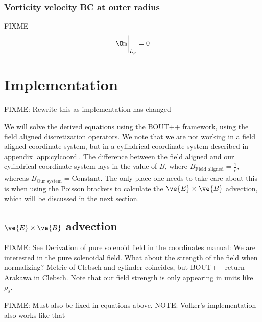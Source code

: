 \subsubsection{Vorticity velocity BC at outer radius}
%
%
FIXME
%
\begin{align*}
    \Om \bigg|_{L_\rho} = 0
\end{align*}


\section{Implementation}
\label{sec:implementation}
FIXME: Rewrite this as implementation has changed

%
We will solve the derived equations using the BOUT++ framework, using the field
aligned discretization operators. We note that we are not working in a field
aligned coordinate system, but in a cylindrical coordinate system described in
appendix \ref{app:cylcoord}. The difference between the field aligned and our
cylindrical coordinate system lays in the value of $B$, where $B_\text{Field
    aligned}=\frac{1}{\rho}$, whereas $B_\text{Our system}=\text{Constant}$.
The only place one needs to take care about this is when using the Poisson
brackets to calculate the $\ve{E}\times \ve{B}$ advection, which will be
discussed in the next section.

\subsection{\texorpdfstring{$\ve{E}\times \ve{B}$}{ExB} advection}
\label{sec:ExBadv}
FIXME: See Derivation of pure solenoid field in the coordinates manual: We are
interested in the pure solenoidal field. What about the strength of the field
when normalizing? Metric of Clebsch and cylinder coincides, but BOUT++ return
Arakawa in Clebsch. Note that our field strength is only appearing in units
like $\rho_s$.

FIXME: Must also be fixed in equations above. NOTE: Volker's implementation
also works like that

